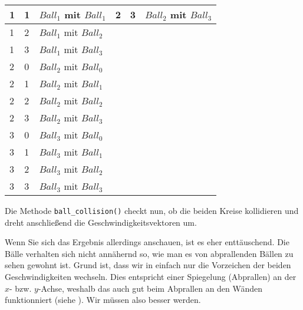 \begin{longtable}{llp{3cm}|llp{3cm}}
    1  &  1 & \cellcolor{red!65}$Ball_1$ mit $Ball_1$ & 2  &  3 & $Ball_2$ mit $Ball_3$\\ \hline
    1  &  2 &                   $Ball_1$ mit $Ball_2$ &    &    &                       \\ \cline{1-3}
    1  &  3 &                   $Ball_1$ mit $Ball_3$ &    &    &                       \\ \cline{1-3}
    2  &  0 & \cellcolor{red!30}$Ball_2$ mit $Ball_0$ &    &    &                       \\ \cline{1-3}
    2  &  1 & \cellcolor{red!30}$Ball_2$ mit $Ball_1$ &    &    &                       \\ \cline{1-3}
    2  &  2 & \cellcolor{red!65}$Ball_2$ mit $Ball_2$ &    &    &                       \\ \cline{1-3}
    2  &  3 &                   $Ball_2$ mit $Ball_3$ &    &    &                       \\ \cline{1-3}
    3  &  0 & \cellcolor{red!30}$Ball_3$ mit $Ball_0$ &    &    &                       \\ \cline{1-3}
    3  &  1 & \cellcolor{red!30}$Ball_3$ mit $Ball_1$ &    &    &                       \\ \cline{1-3}
    3  &  2 & \cellcolor{red!30}$Ball_3$ mit $Ball_2$ &    &    &                       \\ \cline{1-3}
    3  &  3 & \cellcolor{red!65}$Ball_3$ mit $Ball_3$ &    &    &                       \\ \cline{1-3}
\end{longtable} 
\normalsize

Die Methode \texttt{ball\_collision()} checkt nun, ob die beiden Kreise kollidieren und dreht anschließend die Geschwindigkeitsvektoren um.


Wenn Sie sich das Ergebnis allerdings anschauen, ist es eher enttäuschend. Die Bälle verhalten sich nicht annähernd so, wie man es von abprallenden Bällen zu sehen gewohnt ist. Grund ist, dass wir in  einfach nur die Vorzeichen der beiden Geschwindigkeiten wechseln. Dies entspricht einer Spiegelung (Abprallen) an der $x$- bzw. $y$-Achse, weshalb das auch gut beim Abprallen an den Wänden funktionniert (siehe ). Wir müssen also besser werden.


